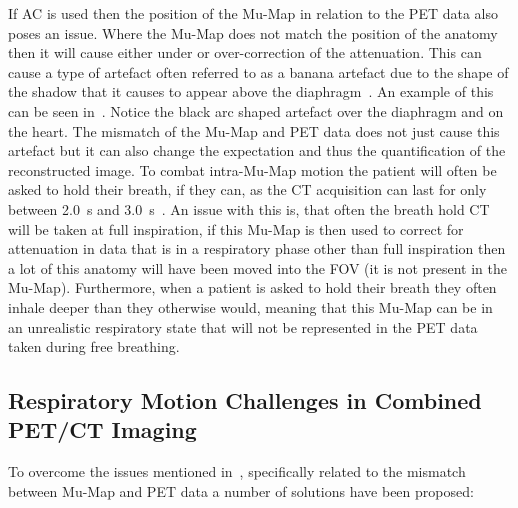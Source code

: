             If \gls{AC} is used then the position of the \gls{Mu-Map} in relation to the \gls{PET} data also poses an issue. Where the \gls{Mu-Map} does not match the position of the anatomy then it will cause either under or over-correction of the attenuation. This can cause a type of artefact often referred to as a banana artefact due to the shape of the shadow that it causes to appear above the diaphragm~\parencite{LungMotionDiaphragmBaiBib}. An example of this can be seen in~. Notice the black arc shaped artefact over the diaphragm and on the heart. The mismatch of the \gls{Mu-Map} and \gls{PET} data does not just cause this artefact but it can also change the expectation and thus the quantification of the reconstructed image. To combat intra-\gls{Mu-Map} motion the patient will often be asked to hold their breath, if they can, as the \gls{CT} acquisition can last for only between \SI{2.0}{\second} and \SI{3.0}{\second}~\parencite{Nyflot2015}. An issue with this is, that often the breath hold \gls{CT} will be taken at full inspiration, if this \gls{Mu-Map} is then used to correct for attenuation in data that is in a respiratory phase other than full inspiration then a lot of this anatomy will have been moved into the \gls{FOV} (it is not present in the \gls{Mu-Map}). Furthermore, when a patient is asked to hold their breath they often inhale deeper than they otherwise would, meaning that this \gls{Mu-Map} can be in an unrealistic respiratory state that will not be represented in the \gls{PET} data taken during free breathing. %
            
        \subsection{Respiratory Motion Challenges in Combined PET/CT Imaging} \label{sec:respiratory_motion_challenges_in_combined_pet_ct_imaging}
            To overcome the issues mentioned in~, specifically related to the mismatch between \gls{Mu-Map} and \gls{PET} data a number of solutions have been proposed:
            
